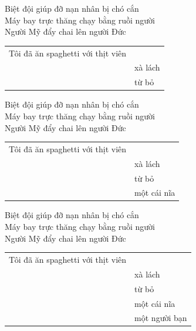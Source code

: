 \documentclass{article}
\begin{document}
\begin{huge}

Biệt đội giúp đỡ nạn nhân bị chó cắn \\
Máy bay trực thăng chạy bằng ruồi người\\
Người Mỹ đẩy chai lên người Đức\\
\begin{tabular}{ll}Tôi đã ăn spaghetti với thịt viên \\
                                        & xà lách \\
                                        & từ bỏ 
\end{tabular}



Biệt đội giúp đỡ nạn nhân bị chó cắn \\
Máy bay trực thăng chạy bằng ruồi người\\
Người Mỹ đẩy chai lên người Đức\\
\begin{tabular}{ll}Tôi đã ăn spaghetti với thịt viên \\
                                        & xà lách \\
                                        & từ bỏ \\
                                        & một cái nĩa 
\end{tabular}



Biệt đội giúp đỡ nạn nhân bị chó cắn \\
Máy bay trực thăng chạy bằng ruồi người\\
Người Mỹ đẩy chai lên người Đức\\
\begin{tabular}{ll}Tôi đã ăn spaghetti với thịt viên \\
                                        & xà lách \\
                                        & từ bỏ \\
                                        & một cái nĩa \\
                                        & một người bạn 
\end{tabular}



\end{huge}
\end{document}
